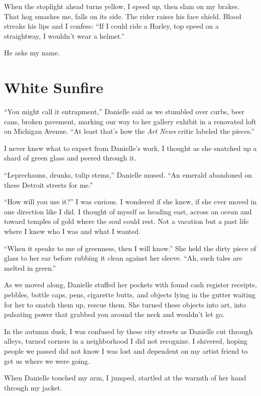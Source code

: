 \documentclass[twoside,10pt]{book}
\begin{document}
When the stoplight ahead turns yellow, I speed up, then slam on my
brakes. That hog smashes me, falls on its side. The rider raises his
face shield. Blood streaks his lips and I confess: ``If I could ride a
Harley, top speed on a straightway, I wouldn't wear a helmet.''

He asks my name.



\cleardoublepage
\chapter{White Sunfire}

``You might call it entrapment,'' Danielle said as we stumbled over
curbs, beer cans, broken pavement, marking our way to her gallery
exhibit in a renovated loft on Michigan Avenue. ``At least that's how
the \emph{Art News} critic labeled the pieces.''

I never knew what to expect from Danielle's work, I thought as she
snatched up a shard of green glass and peered through it.

``Leprechauns, drunks, tulip stems,'' Danielle mused. ``An emerald
abandoned on these Detroit streets for me.''

``How will you use it?'' I was curious. I wondered if she knew, if she
ever moved in one direc­tion like I did. I thought of myself as heading
east, across an ocean and toward temples of gold where the soul could
rest. Not a vacation but a past life where I knew who I was and what I
wanted.

``When it speaks to me of greenness, then I will know.'' She held the
dirty piece of glass to her ear before rubbing it clean against her
sleeve. ``Ah, such tales are melted in green.''

As we moved along, Danielle stuffed her pockets with found cash register
receipts, pebbles, bottle caps, pens, cigarette butts, and objects lying
in the gutter waiting for her to snatch them up, rescue them. She turned
these objects into art, into pulsating power that grabbed you around the
neck and wouldn't let go.

In the autumn dusk, I was confused by these city streets as Danielle cut
through alleys, turned corners in a neighborhood I did not recognize. I
shivered, hoping people we passed did not know I was lost and dependent
on my artist friend to get us where we were going.

When Danielle touched my arm, I jumped, startled at the warmth of her
hand through my jacket.
\end{document}
